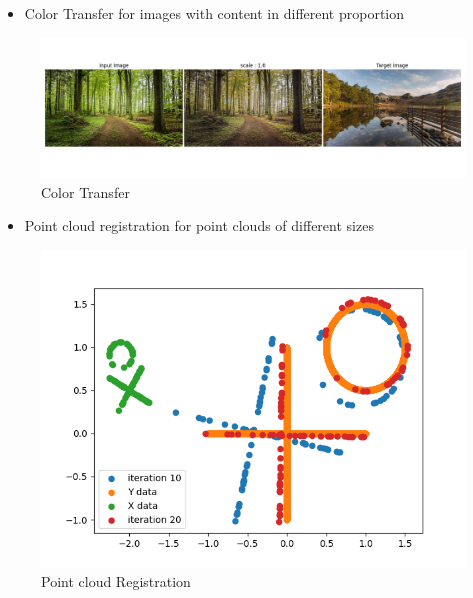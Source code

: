 \documentclass[11pt]{beamer}
\begin{document}
\begin{frame}

\begin{itemize}
\item Color Transfer for images with content in different proportion
\end{itemize}

\begin{figure}[H]
\includegraphics[scale = 0.3,trim= 0cm 2.5cm 0cm 2.5cm]{exemple_image.png}
\caption{Color Transfer}\label{ex_im}
\end{figure}

\end{frame}

\begin{frame}

\begin{itemize}
\item Point cloud registration for point clouds of different sizes
\end{itemize}

\begin{figure}[H]
\centering
\includegraphics[scale = 0.35]{circle_cross_shape2.png}
\caption{Point cloud Registration}\label{ex_shape}
\end{figure}

\end{frame}
\end{document}

